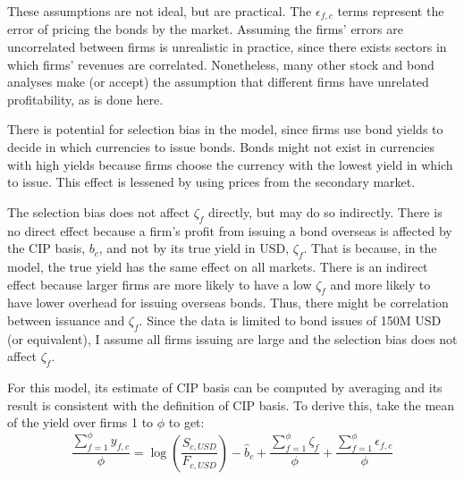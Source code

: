 
These assumptions are not ideal, but are practical.  The $\epsilon_{f,c}$ terms represent the error of pricing the bonds by the market.  Assuming the firms' errors are uncorrelated between firms is unrealistic in practice, since there exists sectors in which firms' revenues are correlated.  Nonetheless, many other stock and bond analyses make (or accept) the assumption that different firms have unrelated profitability, as is done here.  

There is potential for selection bias in the model, since firms use bond yields to decide in which currencies to issue bonds.  Bonds might not exist in currencies with high yields because firms choose the currency with the lowest yield in which to issue.  This effect is lessened by using prices from the secondary market.  

The selection bias does not affect $\zeta_f$ directly, but may do so indirectly.  There is no direct effect because a firm's profit from issuing a bond overseas is affected by the CIP basis, $b_{c}$, and not by its true yield in USD, $\zeta_f$.  That is because, in the model, the true yield has the same effect on all markets.  There is an indirect effect because larger firms are more likely to have a low $\zeta_f$ and more likely to have lower overhead for issuing overseas bonds.  Thus, there might be correlation between issuance and $\zeta_f$.  Since the data is limited to bond issues of 150M USD (or equivalent), I assume all firms issuing are large and the selection bias does not affect $\zeta_f$.





For this model, its estimate of CIP basis can be computed by averaging and its result is consistent with the definition of CIP basis.  To derive this, take the mean of the yield over firms 1 to $\phi$ to get:
\begin{equation}
\frac{\sum_{f=1}^{\phi} y_{f,c}}{\phi} =  \log\left(\frac{S_{c,USD}}{F_{c,USD}}\right) - \hat{b}_{c} 
+ \frac{\sum_{f=1}^{\phi} \zeta_{f}}{\phi} 
+ \frac{\sum_{f=1}^{\phi} \epsilon_{f,c}}{\phi}
\end{equation}

